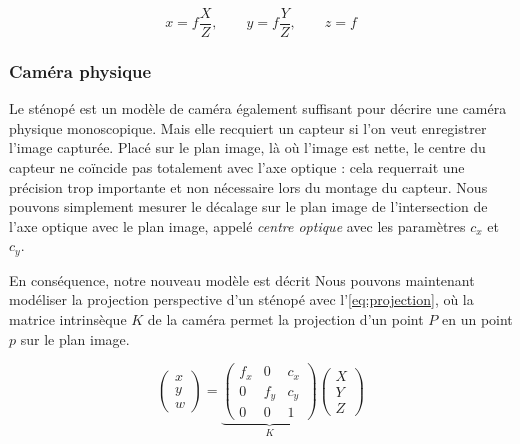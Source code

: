 \begin{equation}
  \label{eq:perspective_projection}
  x = f \frac{X}{Z},\qquad y = f \frac{Y}{Z},\qquad z = f
\end{equation}


\subsubsection{Caméra physique}
Le sténopé est un modèle de caméra également suffisant pour décrire une caméra physique monoscopique. Mais elle recquiert un capteur si l'on veut enregistrer l'image capturée. Placé sur le plan image, là où l'image est nette, le centre du capteur ne coïncide pas totalement avec l'axe optique : cela requerrait une précision trop importante et non nécessaire lors du montage du capteur. Nous pouvons simplement mesurer le décalage sur le plan image de l'intersection de l'axe optique avec le plan image, appelé \emph{centre optique} avec les paramètres $c_x$ et $c_y$.


En conséquence, notre nouveau modèle est décrit 
Nous pouvons maintenant modéliser la projection perspective d'un sténopé avec l'\autoref{eq:projection}, où la matrice intrinsèque $K$ de la caméra permet la projection d'un point $P$ en un point $p$ sur le plan image.

\begin{equation}
  \label{eq:projection}
  \begin{pmatrix}
    x\\
    y\\
    w
  \end{pmatrix}
  =
  \underbrace{
    \begin{pmatrix}
      f_x & 0 & c_x\\
      0 & f_y & c_y\\
      0 & 0 & 1
    \end{pmatrix}
  }_K
  \begin{pmatrix}
    X\\
    Y\\
    Z
  \end{pmatrix}
\end{equation}

